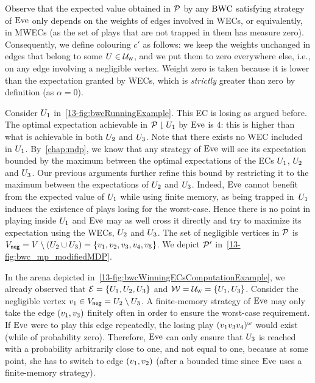Observe that the expected value obtained in ${\mathcal{P}} $ by any $\text{BWC}$ satisfying strategy of $\text{Eve}$ only depends on the weights of edges involved in WECs, or equivalently, in MWECs (as the set of plays that are not trapped in them has measure zero). Consequently, we define colouring $c'$ as follows: we keep the weights unchanged in edges that belong to some $U \in \mathcal{U}_{\textsc{w}}$, and we put them to zero everywhere else, i.e., on any edge involving a negligible vertex. Weight zero is taken because it is lower than the expectation granted by WECs, which is \textit{strictly} greater than zero by definition (as $\alpha = 0$).

\begin{example}
Consider $U_{1}$ in~\cref{13-fig:bwcRunningExample}. This EC is losing as argued before. The optimal expectation achievable in ${\mathcal{P}}  \downharpoonright U_{1}$ by $\text{Eve}$ is $4$: this is higher than what is achievable in both $U_{2}$ and $U_{3}$. Note that there exists no WEC included in $U_{1}$. By~\cref{chap:mdp}, we know that any strategy of $\text{Eve}$ will see its expectation bounded by the maximum between the optimal expectations of the ECs $U_{1}$, $U_{2}$ and $U_{3}$. Our previous arguments further refine this bound by restricting it to the maximum between the expectations of $U_{2}$ and $U_{3}$. Indeed, $\text{Eve}$ cannot benefit from the expected value of $U_{1}$ while using finite memory, as being trapped in~$U_{1}$ induces the existence of plays losing for the worst-case. Hence there is no point in playing inside $U_{1}$ and $\text{Eve}$ may as well cross it directly and try to maximize its expectation using the WECs, $U_{2}$ and $U_{3}$. The set of negligible vertices in ${\mathcal{P}} $ is $V_{{\sf neg}} = V \setminus (U_{2} \cup U_{3}) = \{v_{1}, v_{2}, v_{3}, v_{4}, v_{5}\}$. We depict ${\mathcal{P}} '$ in~\cref{13-fig:bwc_mp_modifiedMDP}.

In the arena depicted in~\cref{13-fig:bwcWinningECsComputationExample}, we already observed that $\mathcal{E} = \{U_{1}, U_{2}, U_{3}\}$ and $\mathcal{W} = \mathcal{U}_{\textsc{w}} = \{U_{1}, U_{3}\}$. Consider the negligible vertex $v_{1} \in V_{{\sf neg}} = U_{2} \setminus U_{3}$. A finite-memory strategy of $\text{Eve}$ may only take the edge $(v_{1}, v_{3})$ finitely often in order to ensure the worst-case requirement. If $\text{Eve}$ were to play this edge repeatedly, the losing play $(v_{1}v_{3}v_{4})^{\omega}$ would exist (while of probability zero). Therefore, $\text{Eve}$ can only ensure that $U_{3}$ is reached with a probability arbitrarily close to one, and not equal to one, because at some point, she has to switch to edge $(v_{1}, v_{2})$ (after a bounded time since $\text{Eve}$ uses a finite-memory strategy).
\end{example}

